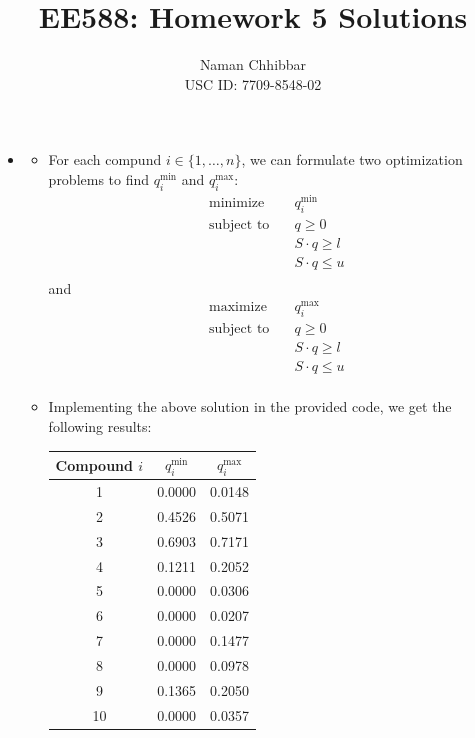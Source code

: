 \documentclass{article}
\title{EE588: Homework 5 Solutions}
\author{
  Naman Chhibbar \\
  USC ID: 7709-8548-02
}
\date{}
\newcommand{\1}{\mathbf{1}}
\begin{document}
\maketitle

\begin{itemize}
  \item \begin{itemize}
    \item[1.] For each compund $i \in \{1, \dots, n\}$, we can formulate two optimization problems to find $q_i^{\min}$ and $q_i^{\max}$:
    \begin{align*}
      \text{minimize} &\quad q_i^{\min} \\
      \text{subject to} &\quad q \geq 0 \\
      &\quad S \cdot q \geq l \\
      &\quad S \cdot q \leq u \\
    \end{align*}
    and
    \begin{align*}
      \text{maximize} &\quad q_i^{\max} \\
      \text{subject to} &\quad q \geq 0 \\
      &\quad S \cdot q \geq l \\
      &\quad S \cdot q \leq u \\
    \end{align*}
    \item[2.] Implementing the above solution in the provided code, we get the following results:
    \begin{table}[H]
      \centering
      \begin{tabular}{|c|c|c|}
        \hline
        Compound $i$ & $q_i^{\min}$ & $q_i^{\max}$ \\
        \hline
        1 & 0.0000 & 0.0148 \\
        2 & 0.4526 & 0.5071 \\
        3 & 0.6903 & 0.7171 \\
        4 & 0.1211 & 0.2052 \\
        5 & 0.0000 & 0.0306 \\
        6 & 0.0000 & 0.0207 \\
        7 & 0.0000 & 0.1477 \\
        8 & 0.0000 & 0.0978 \\
        9 & 0.1365 & 0.2050 \\
        10 & 0.0000 & 0.0357 \\
        \hline
      \end{tabular}
    \end{table}
  \end{itemize}
  

\end{itemize}
\end{document}

